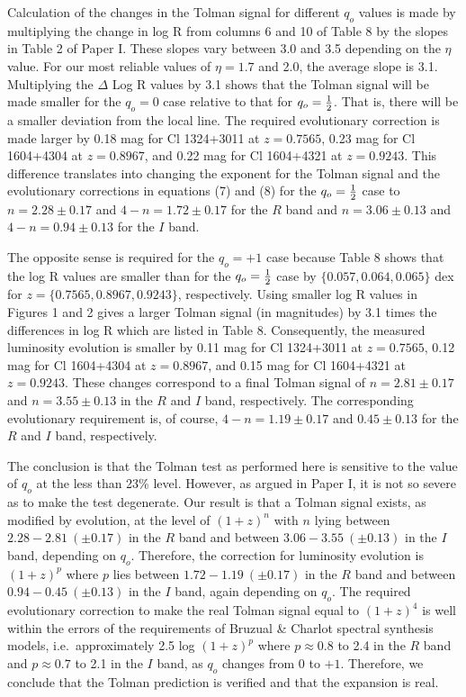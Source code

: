 \documentclass[preprint]{aastex}
\begin{document}
Calculation of the changes in the Tolman signal for different $q_o$
values is made by multiplying the change in log R from columns 6 and
10 of Table 8 by the slopes in Table 2 of Paper I.  These slopes vary
between 3.0 and 3.5 depending on the $\eta$ value. For our most
reliable values of $\eta = 1.7$ and 2.0, the average slope is
3.1. Multiplying the $\Delta$ Log R values by 3.1 shows that the
Tolman signal will be made smaller for the $q_o = 0$ case relative to
that for $q_o = {1\over{2}}$. That is, there will be a smaller
deviation from the local line.  The required evolutionary correction
is made larger by 0.18 mag for Cl 1324+3011 at $z = 0.7565$, 0.23 mag
for Cl 1604+4304 at $z = 0.8967$, and 0.22 mag for Cl 1604+4321 at $z
= 0.9243$. This difference translates into changing the exponent for
the Tolman signal and the evolutionary corrections in equations (7)
and (8) for the $q_o = {1\over{2}}$ case to $n = 2.28 \pm 0.17$ and
$4-n = 1.72 \pm 0.17$ for the $R$ band and $n = 3.06 \pm 0.13$ and
$4-n = 0.94 \pm 0.13$ for the $I$ band.

The opposite sense is required for the $q_o = +1$ case because Table 8
shows that the log R values are smaller than for the $q_o =
{1\over{2}}$ case by $\{0.057, 0.064, 0.065\}$ dex for $z = \{0.7565,
0.8967, 0.9243\}$, respectively. Using smaller log R values in Figures
1 and 2 gives a larger Tolman signal (in magnitudes) by 3.1 times the
differences in log R which are listed in Table 8. Consequently, the
measured luminosity evolution is smaller by 0.11 mag for Cl 1324+3011
at $z = 0.7565$, 0.12 mag for Cl 1604+4304 at $z = 0.8967$, and 0.15
mag for Cl 1604+4321 at $z = 0.9243$. These changes correspond to a
final Tolman signal of $n = 2.81 \pm 0.17$ and $n = 3.55 \pm 0.13$ in
the $R$ and $I$ band, respectively. The corresponding evolutionary
requirement is, of course, $4-n = 1.19 \pm 0.17$ and $0.45 \pm 0.13$
for the $R$ and $I$ band, respectively.

The conclusion is that the Tolman test as performed here is sensitive
to the value of $q_o$ at the less than 23\% level. However, as argued
in Paper I, it is not so severe as to make the test degenerate. Our
result is that a Tolman signal exists, as modified by evolution, at
the level of $(1 + z)^n$ with $n$ lying between $2.28 - 2.81~(\pm
0.17)$ in the $R$ band and between $3.06 - 3.55~(\pm 0.13)$ in the $I$
band, depending on $q_o$. Therefore, the correction for luminosity
evolution is $(1 + z)^p$ where $p$ lies between $1.72 - 1.19~(\pm
0.17)$ in the $R$ band and between $0.94 - 0.45~(\pm 0.13)$ in the $I$
band, again depending on $q_o$.  The required evolutionary correction
to make the real Tolman signal equal to $(1 + z)^4$ is well within the
errors of the requirements of Bruzual \& Charlot spectral synthesis
models, i.e.\ approximately 2.5 log $(1 + z)^p$ where $p \approx 0.8$
to 2.4 in the $R$ band and $p \approx 0.7$ to 2.1 in the $I$ band, as
$q_o$ changes from $0$ to $+1$.  Therefore, we conclude that the
Tolman prediction is verified and that the expansion is real.
\end{document}
